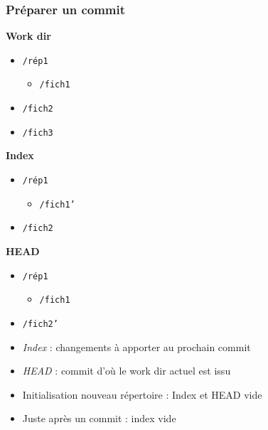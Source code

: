 \documentclass[english, french]{beamer}
\begin{document}
\begin{frame}
	\frametitle{Préparer un commit}
	\begin{minipage}[t]{0.33 \columnwidth}
		\textbf{Work dir}
		\begin{itemize}
			\item[] \texttt{/rép1}
			\begin{itemize}
				\item[] \texttt{/fich1}
			\end{itemize}\vspace{-0.8ex}
			\item[] \texttt{/fich2}
			\item[] \texttt{/fich3}
		\end{itemize}
	\end{minipage}%
	\begin{minipage}[t]{0.33 \columnwidth}
		\textbf{Index}
		\begin{itemize}
			\item[] \texttt{/rép1}
			\begin{itemize}
				\item[] \texttt{/fich1'}
			\end{itemize}\vspace{-0.8ex}
			\item[] \texttt{/fich2}
		\end{itemize}
	\end{minipage}%
	\begin{minipage}[t]{0.33 \columnwidth}
		\textbf{HEAD}
		\begin{itemize}
			\item[] \texttt{/rép1}
			\begin{itemize}
				\item[] \texttt{/fich1}
			\end{itemize}\vspace{-0.8ex}
			\item[] \texttt{/fich2'}
		\end{itemize}
	\end{minipage}
	\begin{itemize}
		\item \emph{Index} : changements à apporter au prochain commit
		\item \emph{HEAD} : commit d’où le work dir actuel est issu
		\item Initialisation nouveau répertoire : Index et HEAD vide
		\item Juste après un commit : index vide
	\end{itemize}
\end{frame}
\end{document}
